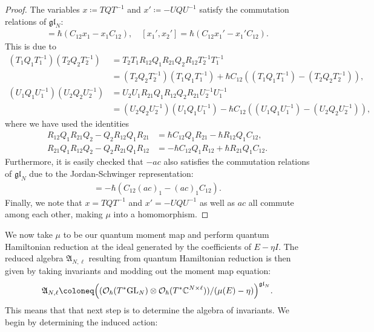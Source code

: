 \begin{proof}
The variables $x \coloneq TQT^{-1}$ and $x' \coloneq -UQU^{-1}$ satisfy the commutation relations of $\mathfrak{gl}_N$:
\begin{align*}
[x_1,x_2] = \hbar(C_{12} x_1 - x_1 C_{12}), \quad [x_1',x_2'] = \hbar(C_{12} x_1' - x_1' C_{12}).
\end{align*}
This is due to
\begin{align*}
(T_1 Q_1 T_1^{-1}) (T_2 Q_2 T_2^{-1})
&= T_2 T_1 R_{12} Q_1 R_{21} Q_2 R_{12} T_2^{-1} T_1^{-1} \\
&= (T_2 Q_2 T_2^{-1}) (T_1 Q_1 T_1^{-1}) + \hbar C_{12} ((T_1 Q_1 T_1^{-1})-(T_2 Q_2 T_2^{-1})), \\
(U_1 Q_1 U_1^{-1}) (U_2 Q_2 U_2^{-1})
&= U_2 U_1 R_{21} Q_1 R_{12} Q_2 R_{21} U_2^{-1} U_1^{-1} \\
&= (U_2 Q_2 U_2^{-1}) (U_1 Q_1 U_1^{-1}) - \hbar C_{12} ((U_1 Q_1 U_1^{-1})-(U_2 Q_2 U_2^{-1})),
\end{align*}
where we have used the identities
\begin{align*}
R_{12} Q_1 R_{21} Q_2 - Q_2 R_{12} Q_1 R_{21} &= \hbar C_{12} Q_1 R_{21} - \hbar R_{12} Q_1 C_{12}, \\
R_{21} Q_1 R_{12} Q_2 - Q_2 R_{21} Q_1 R_{12} &= -\hbar C_{12} Q_1 R_{12} + \hbar R_{21} Q_1 C_{12}.
\end{align*}
Furthermore, it is easily checked that $-ac$ also satisfies the commutation relations of $\mathfrak{gl}_N$ due to the Jordan-Schwinger representation:
\begin{align*}
[(ac)_1,(ac)_2] = -\hbar (C_{12} (ac)_1 - (ac)_1 C_{12}).
\end{align*}
Finally, we note that $x = TQT^{-1}$ and $x' = -UQU^{-1}$ as well as $ac$ all commute among each other, making $\mu$ into a homomorphism.
\end{proof}

We now take $\mu$ to be our quantum moment map and perform quantum Hamiltonian reduction at the ideal generated by the coefficients of $E-\eta I$. The reduced algebra $\mathfrak{A}_{N,\ell}$ resulting from quantum Hamiltonian reduction is then given by taking invariants and modding out the moment map equation:
\begin{equation}
\mathfrak{A}_{N,\ell} \coloneq \Big( (\mathcal{O}_\hbar(T^* \mathrm{GL}_N) \otimes \mathcal{O}_\hbar(T^* \C^{N \times \ell})) /(\mu(E)-\eta) \Big)^{\mathfrak{gl}_N}.
\end{equation}
This means that that next step is to determine the algebra of invariants. We begin by determining the induced action:

